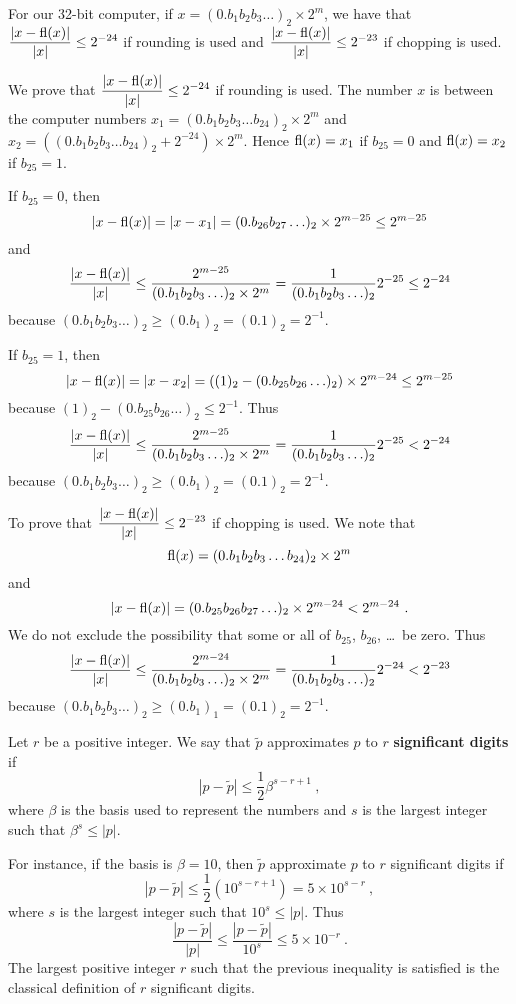 \begin{rmk}
For our 32-bit computer, if $x=(0.b_1 b_2 b_3\ldots)_2 \times 2^m$, we 
have that $\displaystyle \frac{|x-\operatorname{fl}(x)|}{|x|} \leq 2^{-24}$ if rounding
is used and $\displaystyle \frac{|x-\operatorname{fl}(x)|}{|x|} \leq 2^{-23}$ if
chopping is used.

 We prove that $\displaystyle \frac{|x-\operatorname{fl}(x)|}{|x|}
\leq 2^{-24}$ if rounding is used.  The number $x$ is between the
computer numbers $x_1 = (0.b_1b_2b_3\ldots b_{24})_2 \times 2^m$ and
$x_2 = ((0.b_1b_2b_3\ldots b_{24})_2 + 2^{-24}) \times 2^m$.
Hence $\operatorname{fl}(x) = x_1$ if $b_{25} =0$ and $\operatorname{fl}(x) = x_2$ if $b_{25}=1$.

If $b_{25}=0$, then
\[
|x-\operatorname{fl}(x)| = | x- x_1 | = (0.b_{26} b_{27} \ldots)_2 \times 2^{m-25}
\leq 2^{m-25}
\]
and
\[
\frac{|x-\operatorname{fl}(x)|}{|x|} \leq
\frac{2^{m-25}}{(0.b_1 b_2 b_3\ldots)_2 \times 2^m}
= \frac{1}{(0.b_1 b_2 b_3\ldots)_2} 2^{-25} \leq 2^{-24}
\]
because $(0.b_1 b_2 b_3\ldots)_2 \geq (0.b_1)_2 = (0.1)_2 = 2^{-1}$.

If $b_{25}=1$, then
\[
|x-\operatorname{fl}(x)| = | x- x_2 | = ((1)_2 - (0.b_{25} b_{26} \ldots)_2) \times 2^{m-24}
\leq 2^{m-25}
\]
because $(1)_2-(0.b_{25}b_{26} \ldots)_2 \leq 2^{-1}$.  Thus
\[
\frac{|x-\operatorname{fl}(x)|}{|x|} \leq
\frac{2^{m-25}}{(0.b_1 b_2 b_3\ldots)_2 \times 2^m}
= \frac{1}{(0.b_1 b_2 b_3\ldots)_2} 2^{-25}
< 2^{-24}
\]
because $(0.b_1b_2b_3\ldots)_2 \geq (0.b_1)_2 =
(0.1)_2 = 2^{-1}$.

 To prove that
$\displaystyle \frac{|x-\operatorname{fl}(x)|}{|x|} \leq 2^{-23}$ if
chopping is used.  We note that
\[
\operatorname{fl}(x) = (0.b_1b_2b_3\ldots b_{24})_2 \times 2^m
\]
and
\[
|x-\operatorname{fl}(x)| =  (0.b_{25}b_{26} b_{27} \ldots)_2 \times 2^{m-24}
< 2^{m-24} \ .
\]
We do not exclude the possibility that some or all of $b_{25}$,
$b_{26}$, \ldots\ be zero. Thus
\[
\frac{|x-\operatorname{fl}(x)|}{|x|} \leq
\frac{2^{m-24}}{(0.b_1 b_2 b_3\ldots)_2 \times 2^m}
= \frac{1}{(0.b_1 b_2 b_3\ldots)_2} 2^{-24}
< 2^{-23}
\]
because $(0.b_1b_2b_3\ldots)_2 \geq (0.b_1)_1 = (0.1)_2 = 2^{-1}$.
\end{rmk}

\begin{defn}
Let $r$ be a positive integer.  We say that $\tilde{p}$
approximates $p$ to $r$
{\bfseries significant digits} if
\[
|p - \tilde{p}| \leq \frac{1}{2} \beta^{s-r+1} \ ,
\]
where $\beta$ is the basis used to represent the numbers and $s$
is the largest integer such that $\beta^s \leq |p|$.
\end{defn}

For instance, if the basis is $\beta = 10$, then $\tilde{p}$
approximate $p$ to $r$ significant digits if
\[
|p - \tilde{p}| \leq \frac{1}{2} \left( 10^{s-r+1} \right) = 5 \times 10^{s-r}
\ ,
\]
where $s$ is the largest integer such that $10^s \leq |p|$.  Thus
\[
\frac{|p - \tilde{p}|}{|p|} \leq \frac{|p - \tilde{p}|}{10^s}
\leq 5 \times 10^{-r} \ .
\]
The largest positive integer $r$ such that the previous inequality is
satisfied is the classical definition of $r$ significant digits. 


